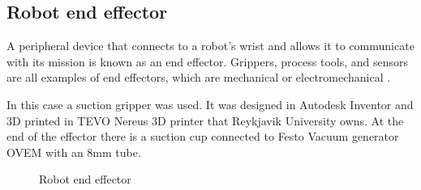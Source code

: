 \subsection{Robot end effector\label{subsec:robotend}}
A peripheral device that connects to a robot's wrist and allows it to communicate with its mission is known as an end effector. Grippers, process tools, and sensors are all examples of end effectors, which are mechanical or electromechanical \cite{wilson_relative_1996}. 

In this case a suction gripper was used. It was designed in Autodesk Inventor \cite{noauthor_inventor_nodate} and 3D printed in TEVO Nereus 3D printer that Reykjavik University owns. At the end of the effector there is a suction cup connected to Festo Vacuum generator OVEM with an 8mm tube.
\begin{figure}[ht]
    \centering
    \hfill
    \caption{Robot end effector}
    \label{figure: endeffector}
\end{figure}

